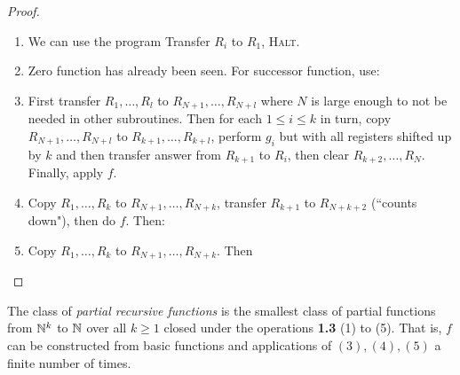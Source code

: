 \documentclass[10pt,a4paper]{article}
\begin{document}
\begin{proof}\item
\begin{enumerate}
\item We can use the program Transfer $R_i$ to $R_1$, \textsc{Halt}.
\item Zero function has already been seen. For successor function, use:
\begin{center}
\end{center}
\item First transfer $R_1,\ldots, R_l$ to $R_{N+1},\ldots, R_{N+l}$ where $N$ is large enough to not be needed in other subroutines. Then for each $1\leq i\leq k$ in turn, copy $R_{N+1}, \ldots, R_{N+l}$ to $R_{k+1},\ldots, R_{k+l}$, perform $g_i$ but with all registers shifted up by $k$ and then transfer answer from $R_{k+1}$ to $R_{i}$, then clear $R_{k+2},\ldots,R_N$. Finally, apply $f$. 
\item Copy $R_1,\ldots,R_k$ to $R_{N+1},\ldots,R_{N+k}$, transfer $R_{k+1}$ to $R_{N+k+2}$ (``counts down"), then do $f$. Then:
\begin{center}
\end{center}
\item Copy $R_1, \ldots, R_k$ to $R_{N+1},\ldots,R_{N+k}$. Then
\begin{center}
\end{center}
\end{enumerate}
\end{proof}
The class of \emph{partial recursive functions} is the smallest class of partial functions from $\mathbb{N}^k$ to $\mathbb{N}$ over all $k\geq 1$ closed under the operations \textbf{1.3} (1) to (5). That is, $f$ can be constructed from basic functions and applications of $(3), (4), (5)$ a finite number of times.
\end{document}

